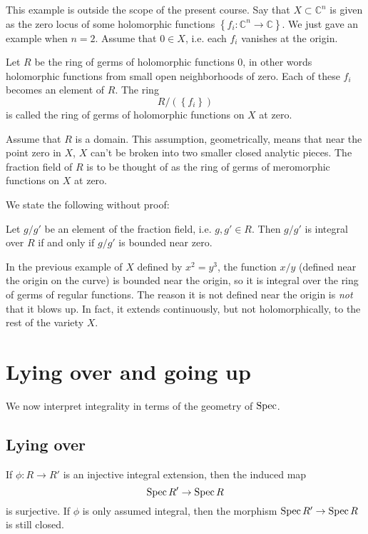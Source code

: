 \begin{example}
This example is outside the scope of the present course.  Say that $X \subset
\mathbb{C}^n$ is given as the zero locus of some holomorphic functions
$\left\{f_i: \mathbb{C}^{n} \to \mathbb{C}\right\}$.  We just gave an example
when $n=2$.
Assume that $0 \in X$, i.e. each $f_i$ vanishes at the origin.

Let $R$ be the ring of germs of holomorphic functions $0$, in other words
holomorphic functions from small open neighborhoods of zero.  Each of these
$f_i$ becomes an  element of $R$.  The ring
\[ R/(\left\{f_i\right\} ) \]
is called the ring of germs of holomorphic functions on $X$ at zero.

Assume that $R$ is a domain.  This assumption, geometrically, means that near
the point zero in $X$, $X$ can't be broken into two smaller closed analytic
pieces.  The fraction field of $R$ is to be thought of as the ring of
germs of meromorphic functions on $X$ at zero.

We state the following without proof:

\begin{theorem}
Let $g/g'$ be an element of the fraction field, i.e. $g, g' \in R$. Then $g/g'$
is integral over $R$ if and only if $g/g'$ is bounded near zero.
\end{theorem}

In the previous example of $X$ defined by $x^2 = y^3$, the function $x/y$
(defined near the origin on the curve) is
bounded near the origin, so it is integral over the ring of germs of regular
functions. The reason it is not defined near the origin is \emph{not} that it
blows up. In fact, it extends continuously, but not holomorphically, to the
rest of the variety $X$.
\end{example}

\section{Lying over and going up}
We now interpret integrality in terms of the geometry of $\operatorname{Spec}$.


\subsection{Lying over}

\begin{proposition}
If $\phi: R \to R'$ is an injective integral extension, then the induced map
\[ \operatorname{Spec} R' \to \operatorname{Spec} R  \]
is surjective.
If $\phi$ is only assumed integral, then the morphism $\operatorname{Spec} R'\to \operatorname{Spec} R$ is
still closed.
\end{proposition}

